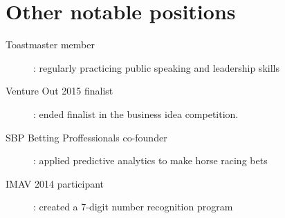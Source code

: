 \documentclass{CurriculumVitae}
\begin{document}
  \section{Other notable positions}
    \begin{description}
       \item[Toastmaster member]: regularly practicing public speaking and leadership skills
       \item[Venture Out 2015 finalist]: ended finalist in the business idea competition.
       \item[SBP Betting Proffessionals co-founder]: applied predictive analytics to make horse racing bets 
       \item[IMAV 2014 participant]:  created a 7-digit number recognition program 
    \end{description}
\end{document}
